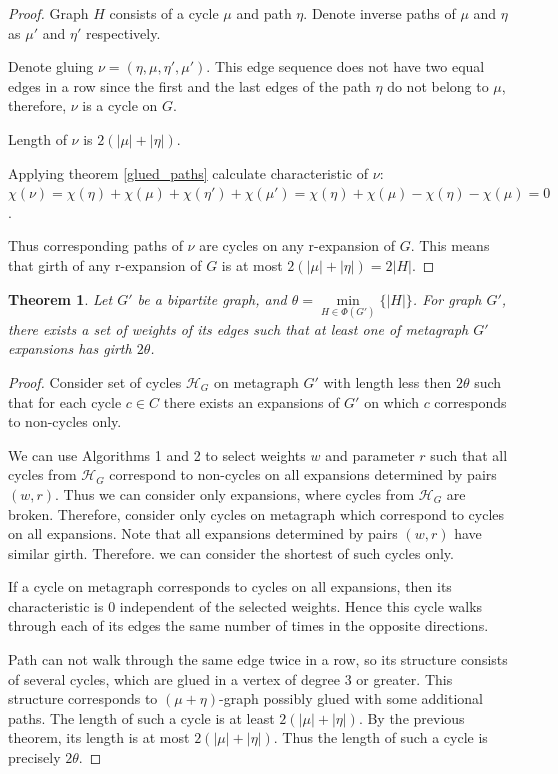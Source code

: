 \documentclass[leqno]{aadmbook}
\newtheorem{theorem}{Theorem}
\begin{document}
\begin{proof}
    Graph $H$ consists of a cycle $\mu$ and path $\eta$. Denote inverse paths of $\mu$ and $\eta$ as $\mu'$ and $\eta'$ respectively.

    Denote gluing $\nu = (\eta, \mu, \eta', \mu')$. This edge sequence does not have two equal edges in a row since the first and the last edges of the path $\eta$ do not belong to $\mu$, therefore, $\nu$ is a cycle on $G$.

    Length of $\nu$ is $2(|\mu| + |\eta|)$.

    Applying theorem \ref{glued_paths} calculate characteristic of $\nu$: $\chi(\nu) = \chi(\eta) + \chi(\mu) + \chi(\eta') + \chi(\mu') = \chi(\eta) + \chi(\mu) - \chi(\eta) - \chi(\mu) = 0$.

    Thus corresponding paths of $\nu$ are cycles on any r-expansion of $G$. This means that girth of any r-expansion of $G$ is at most $2(|\mu| + |\eta|) = 2|H|$.
\end{proof}

\begin{theorem}

Let $G'$ be a bipartite graph, and $\theta = \min\limits_{H \in \Phi(G')} \{ |H| \}$. For graph $G'$, there exists a set of weights of its edges such that at least one of metagraph $G'$ expansions has girth $2 \theta$.

\end{theorem}

\begin{proof}

Consider set of cycles $\mathcal{H}_G$ on metagraph $G'$ with length less then $2 \theta$ such that for each cycle $c \in C$ there exists an expansions of $G'$ on which $c$ corresponds to non-cycles only. 

We can use Algorithms 1 and 2 to select weights $w$ and parameter $r$ such that all cycles from $\mathcal{H}_G$ correspond to non-cycles on all expansions determined by pairs $(w, r)$. Thus we can consider only expansions, where cycles from $\mathcal{H}_G$ are broken. Therefore, consider only cycles on metagraph which correspond to cycles on all expansions. Note that all expansions determined by pairs $(w, r)$ have similar girth. Therefore. we can consider the shortest of such cycles only.

If a cycle on metagraph corresponds to cycles on all expansions, then its characteristic is $0$ independent of the selected weights. Hence this cycle walks through each of its edges the same number of times in the opposite directions.

Path can not walk through the same edge twice in a row, so its structure consists of several cycles, which are glued in a vertex of degree $3$ or greater. This structure corresponds to $(\mu + \eta)$-graph possibly glued with some additional paths. The length of such a cycle is at least $2(|\mu| + |\eta|)$. By the previous theorem, its length is at most $2(|\mu| + |\eta|)$. Thus the length of such a cycle is precisely $2 \theta$.

\end{proof}
\end{document}
